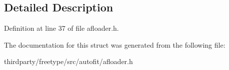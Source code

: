 \subsection{Detailed Description}


Definition at line 37 of file afloader.\+h.



The documentation for this struct was generated from the following file\+:\begin{DoxyCompactItemize}
\item 
thirdparty/freetype/src/autofit/afloader.\+h\end{DoxyCompactItemize}
